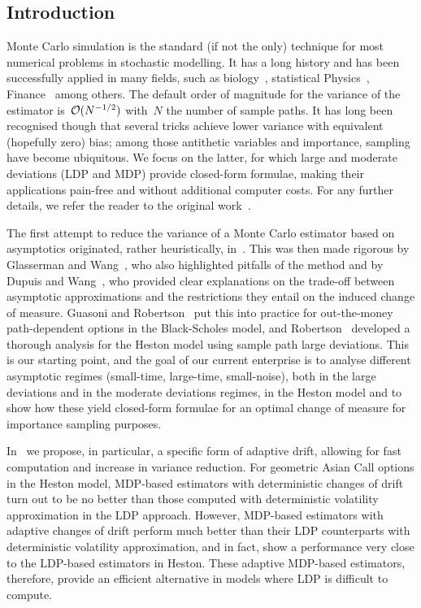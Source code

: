 \subsection{Introduction}

Monte Carlo simulation is the  standard (if not the only) technique for most numerical problems in stochastic modelling.
It has a long history and has been successfully applied in many fields, such as biology~\cite{Manly2018RandomizationBiology}, statistical Physics~\cite{Binder2012MontePhysics}, Finance~\cite{Glasserman1997CounterexamplesProbabilities} among others.
The default order of magnitude for the variance of the estimator is~$\mathcal{O}(N^{-1/2})$ with~$N$ the number of sample paths.
It has long been recognised though that several tricks achieve lower variance with equivalent (hopefully zero) bias; among those antithetic variables and importance, sampling have become ubiquitous.
We focus on the latter, for which large and moderate deviations (LDP and MDP) provide closed-form formulae, 
making their applications pain-free and without additional computer costs. For any further details, we refer the reader to the original work~\cite{Geha2023LargeModel}.

The first attempt to reduce the variance of a Monte Carlo estimator based on asymptotics originated, rather heuristically, in~\cite{Siegmund1976ImportanceTests}. 
This was then made rigorous by Glasserman and Wang~\cite{Glasserman1997CounterexamplesProbabilities}, who also highlighted pitfalls of the method and by Dupuis and Wang~\cite{Dupuis2004ImportanceGames}, who provided clear explanations on the trade-off between asymptotic approximations and the restrictions they entail on the induced change of measure.
Guasoni and Robertson~\cite{Guasoni2007OptimalTime} 
put this into practice for out-the-money path-dependent options in the Black-Scholes model,
and Robertson~\cite{Robertson2010SampleModels} developed a thorough analysis for the Heston model using sample path large deviations.
This is our starting point,
and the goal of our current enterprise is to analyse different asymptotic regimes 
(small-time, large-time, small-noise),
both in the large deviations and in the moderate deviations regimes, in the Heston model 
and to show how these yield closed-form formulae for an optimal change of measure for importance sampling purposes.

In~\cite{Geha2023LargeModel} we propose, in particular, a specific form of adaptive drift, allowing for fast computation
and increase in variance reduction.
For  geometric Asian Call options in the Heston model, MDP-based estimators with deterministic changes of drift turn out to be no better than those computed with deterministic volatility approximation in the LDP approach. 
However, MDP-based estimators with adaptive changes of drift perform much better than their LDP counterparts with deterministic volatility approximation, 
and in fact, show a performance very close to the LDP-based estimators in Heston. 
These adaptive MDP-based estimators, therefore, provide an efficient alternative in models where 
LDP is difficult to compute.

